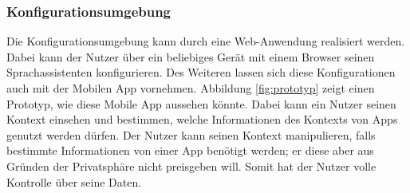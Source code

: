\subsubsection{Konfigurationsumgebung}
Die Konfigurationsumgebung kann durch eine Web-Anwendung realisiert werden. Dabei kann der Nutzer über ein beliebiges Gerät mit einem Browser seinen Sprachassistenten konfigurieren. Des Weiteren lassen sich diese Konfigurationen auch mit der Mobilen App vornehmen. Abbildung \ref{fig:prototyp} zeigt einen Prototyp, wie diese Mobile App aussehen könnte. Dabei kann ein Nutzer seinen Kontext einsehen und bestimmen, welche Informationen des Kontexts von Apps genutzt werden dürfen. Der Nutzer kann seinen Kontext manipulieren, falls bestimmte Informationen von einer App benötigt werden; er diese aber aus Gründen der Privatsphäre nicht preisgeben will. Somit hat der Nutzer volle Kontrolle über seine Daten. 

